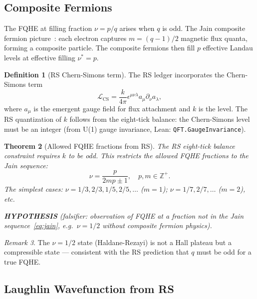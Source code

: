 \documentclass[12pt,a4paper]{article}
\newtheorem{theorem}{Theorem}[section]
\theoremstyle{definition}
\newtheorem{definition}[theorem]{Definition}
\theoremstyle{remark}
\newtheorem{remark}[theorem]{Remark}
\begin{document}
\subsection{Composite Fermions}

The FQHE at filling fraction $\nu = p/q$ arises when $q$ is odd.
The Jain composite fermion picture~\cite{Jain1989}: each electron
captures $m = (q-1)/2$ magnetic flux quanta, forming a composite
particle.  The composite fermions then fill $p$ effective Landau levels
at effective filling $\nu^* = p$.

\begin{definition}[RS Chern-Simons term]
The RS ledger incorporates the Chern-Simons term
\begin{equation}
  \mathcal{L}_\mathrm{CS} = \frac{k}{4\pi}
  \epsilon^{\mu\nu\lambda} a_\mu \partial_\nu a_\lambda,
  \label{eq:CS}
\end{equation}
where $a_\mu$ is the emergent gauge field for flux attachment and
$k$ is the level.  The RS quantization of $k$ follows from the
eight-tick balance: the Chern-Simons level must be an integer
(from U(1) gauge invariance, Lean: \texttt{QFT.GaugeInvariance}).
\end{definition}

\begin{theorem}[Allowed FQHE fractions from RS]\label{thm:fqhe}
The RS eight-tick balance constraint requires $k$ to be odd.  This
restricts the allowed FQHE fractions to the Jain sequence:
\begin{equation}
  \nu = \frac{p}{2mp \pm 1}, \quad p, m \in \mathbb{Z}^+.
  \label{eq:jain}
\end{equation}
The simplest cases: $\nu = 1/3, 2/3, 1/5, 2/5, \ldots$ ($m = 1$);
$\nu = 1/7, 2/7, \ldots$ ($m = 2$), etc.

\textbf{HYPOTHESIS} (falsifier: observation of FQHE at a fraction
not in the Jain sequence~\eqref{eq:jain}, e.g.\ $\nu = 1/2$
without composite fermion physics).
\end{theorem}

\begin{remark}
The $\nu = 1/2$ state (Haldane-Rezayi) is not a Hall plateau but a
compressible state — consistent with the RS prediction that $q$ must
be odd for a true FQHE.
\end{remark}

\subsection{Laughlin Wavefunction from RS}
\end{document}
